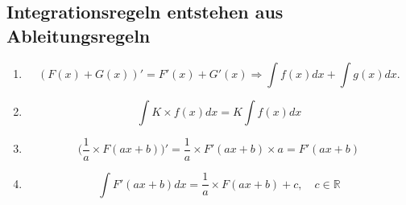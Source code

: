 \subsection{Integrationsregeln entstehen aus Ableitungsregeln}
\begin{enumerate}
\item \[(F(x) + G(x))' = F'(x) + G'(x) \Rightarrow \int f(x)dx + \int g(x)dx. \] 
\item \[\int K \times f(x)dx = K \int f(x)dx \]
\item \[\bigg( \frac{1}{a} \times F(ax+b)\bigg)'=\frac{1}{a} \times F'(ax+b)\times a = F'(ax+b)\]
\item \[ \int F' (ax+b) dx = \frac{1}{a} \times F(ax+b)+ c , \quad c \in \mathbb{R} \]
\end{enumerate}